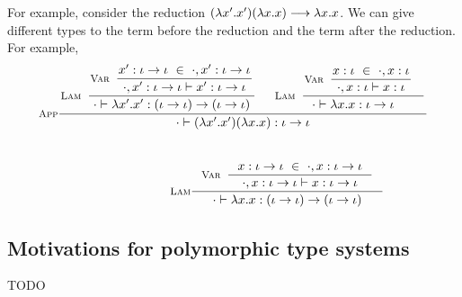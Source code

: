 For example, consider the reduction $(\lambda x'.x')(\lambda x.x) --> \lambda x.x$.
We can give different types to the term before the reduction and the
term after the reduction. For example,
\[\setpremisesend{.1em} 
\inference[\sc App]
 {
   \inference[\sc Lam]
     { \inference[\sc Var]
         {x' : \iota -> \iota ~\in~ \cdot, x' : \iota -> \iota}
         {\cdot,x' : \iota -> \iota |- x': \iota -> \iota}
     }
     {\cdot |- \l x'.x' : (\iota -> \iota) -> (\iota -> \iota)}
 &
   \inference[\sc Lam]
     {\inference[\sc Var]{x:\iota ~\in~ \cdot,x:\iota}
                         {\cdot,x:\iota |- x:\iota} \phantom{x'}}
     {\cdot |- \l x.x : \iota -> \iota \phantom{(x')}}
 }
 {\cdot |- (\l x'.x')(\l x.x) : \iota -> \iota}
\]
\\
\[\qquad\qquad\qquad\quad
\inference[\sc Lam]
  {\inference[\sc Var]{x:\iota->\iota ~\in~ \cdot,x:\iota->\iota}
                      {\cdot,x:\iota->\iota |- x:\iota->\iota} }
  {\cdot |- \l x.x : (\iota -> \iota) -> (\iota -> \iota)}
\]


\paragraph{}

\subsection{Motivations for polymorphic type systems}\label{sec:stlc:topoly}
TODO
